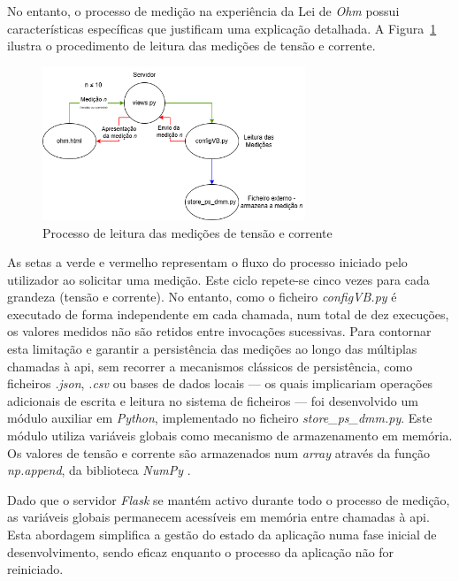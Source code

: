 No entanto, o processo de medição na experiência da Lei de \textit{Ohm} possui características específicas que justificam uma explicação detalhada. A Figura~\ref{fig:processoleituraUI} ilustra o procedimento de leitura das medições de tensão e corrente.

\begin{figure}[hbtp]
	\centering
	\includegraphics[width=0.7\textwidth]{figures/medicoes_OHM.drawio.png}
	\caption{Processo de leitura das medições de tensão e corrente}
	\label{fig:processoleituraUI}
\end{figure}

As setas a verde e vermelho representam o fluxo do processo iniciado pelo utilizador ao solicitar uma medição. Este ciclo repete-se cinco vezes para cada grandeza (tensão e corrente). No entanto, como o ficheiro \textit{configVB.py} é executado de forma independente em cada chamada, num total de dez execuções, os valores medidos não são retidos entre invocações sucessivas. Para contornar esta limitação e garantir a persistência das medições ao longo das múltiplas chamadas à \acrshort{api}, sem recorrer a mecanismos clássicos de persistência, como ficheiros \textit{.json}, \textit{.csv} ou bases de dados locais — os quais implicariam operações adicionais de escrita e leitura no sistema de ficheiros — foi desenvolvido um módulo auxiliar em \textit{Python}, implementado no ficheiro \textit{store\_ps\_dmm.py}. Este módulo utiliza variáveis globais como mecanismo de armazenamento em memória. Os valores de tensão e corrente são armazenados num \textit{array} através da função \textit{np.append}, da biblioteca \textit{NumPy} \cite{NumPy}.

Dado que o servidor \textit{Flask} se mantém activo durante todo o processo de medição, as variáveis globais permanecem acessíveis em memória entre chamadas à \acrshort{api}. Esta abordagem simplifica a gestão do estado da aplicação numa fase inicial de desenvolvimento, sendo eficaz enquanto o processo da aplicação não for reiniciado.


